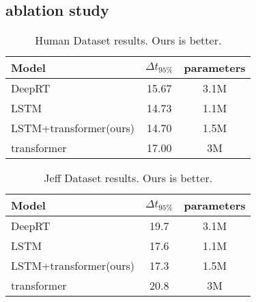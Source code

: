 \subsection{ablation study}
%
%
%
%
%
%
%
%
%
%
%
\begin{table}
   \begin{center}
   \begin{tabular}{|l|c|c|}
   \hline
   Model & $\Delta$$t_{95\%}$ & parameters \\
   \hline\hline
   DeepRT & 15.67 & 3.1M \\
   LSTM & 14.73 & 1.1M \\
   LSTM+transformer(ours) & 14.70 & 1.5M \\
   transformer & 17.00 & 3M \\
   \hline
   \end{tabular}
   \end{center}
   \caption{Human Dataset results.   Ours is better.}
   \label{table:Human}
   \end{table}


   \begin{table}
      \begin{center}
      \begin{tabular}{|l|c|c|}
      \hline
      Model & $\Delta$$t_{95\%}$ & parameters \\
      \hline\hline
      DeepRT & 19.7 & 3.1M \\
      LSTM & 17.6 & 1.1M \\
      LSTM+transformer(ours) & 17.3 & 1.5M \\
      transformer & 20.8 & 3M \\
      \hline
      \end{tabular}
      \end{center}
      \caption{Jeff Dataset results.   Ours is better.}
      \label{table:Jeff}
      \end{table}

